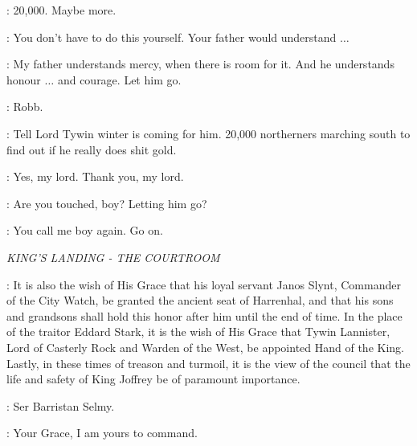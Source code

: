 \SPY: 20,000. Maybe more. 

\RODRIK: You don't have to do this yourself. Your father would understand $\ldots$  

\ROBB: My father understands mercy, when there is room for it. And he understands honour $\ldots$ and courage. Let him go. 

\CATELYN: Robb. 

\ROBB: Tell Lord Tywin winter is coming for him. 20,000 northerners marching south to find out if he really does shit gold. 

\SPY: Yes, my lord. Thank you, my lord. 


\UMBER: Are you touched, boy? Letting him go? 

\ROBB: You call me boy again. Go on. 



\scene

\textit{KING'S LANDING - THE COURTROOM}


\PYCELLE: It is also the wish of His Grace that his loyal servant Janos Slynt, Commander of the City Watch, be granted the ancient seat of Harrenhal, and that his sons and grandsons shall hold this honor after him until the end of time.  In the place of the traitor Eddard Stark, it is the wish of His Grace that Tywin Lannister, Lord of Casterly Rock and Warden of the West, be appointed Hand of the King. Lastly, in these times of treason and turmoil, it is the view of the council that the life and safety of King Joffrey be of paramount importance. 

\CERSEI:  Ser Barristan Selmy. 


\SELMY: Your Grace, I am yours to command. 

